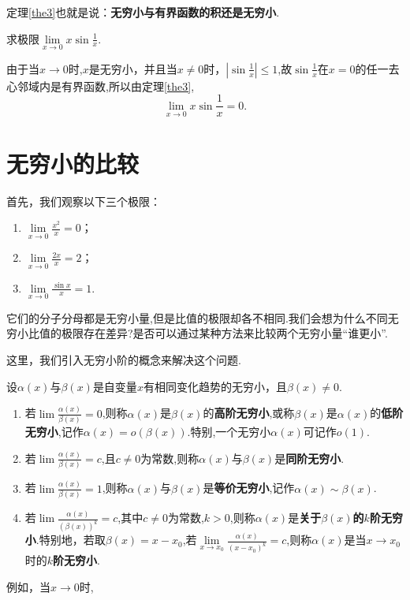 	定理\ref{the3}也就是说：\textbf{无穷小与有界函数的积还是无穷小}.
	
	\begin{example}
		求极限$\lim\limits_{x\to 0}x\sin\frac{1}{x}$.
	\end{example}

	\begin{solution}
		由于当$x\to 0$时,$x$是无穷小，并且当$x\ne 0$时，$\left|\sin\frac{1}{x}\right| \le 1$,故$\sin\frac{1}{x}$在$x=0$的任一去心邻域内是有界函数,所以由定理\ref{the3},
		\[
		\lim_{x\to 0}x\sin\frac{1}{x}=0.
		\]
	\end{solution}

	\section{无穷小的比较}
	首先，我们观察以下三个极限：
	\begin{enumerate}
		\item $\lim\limits_{x\to 0}\frac{x^2}{x}=0$；
		\item $\lim\limits_{x\to 0}\frac{2x}{x}=2$；
		\item $\lim\limits_{x\to 0}\frac{\sin{x}}{x}=1$.
	\end{enumerate}

	它们的分子分母都是无穷小量,但是比值的极限却各不相同.我们会想为什么不同无穷小比值的极限存在差异?是否可以通过某种方法来比较两个无穷小量“谁更小”.
	
	这里，我们引入无穷小阶的概念来解决这个问题.
	\begin{definition}
		设$\alpha (x)\text{与} \beta (x)$是自变量$x$有相同变化趋势的无穷小，且$\beta (x)\ne 0.$
		\begin{enumerate}
			\item 
			若$\lim\limits_{}\frac{\alpha(x)}{\beta (x)}=0$,则称$\alpha(x)$是$\beta(x)$的\textbf{高阶无穷小},或称$\beta(x)$是$\alpha(x)$的\textbf{低阶无穷小},记作$\alpha(x)=o(\beta(x))$.特别,一个无穷小$\alpha(x)$可记作$o(1)$.
			\item 
			若$\lim\limits_{}\frac{\alpha(x)}{\beta (x)}=c$,且$c\ne 0$为常数,则称$\alpha(x)$与$\beta(x)$是\textbf{同阶无穷小}.
			\item 
			若$\lim\limits_{}\frac{\alpha(x)}{\beta (x)}=1$,则称$\alpha(x)$与$\beta(x)$是\textbf{等价无穷小},记作$\alpha (x)\sim\beta(x)$.
			\item 
			若$\lim\limits_{}\frac{\alpha(x)}{(\beta (x))^k}=c$,其中$c\ne 0$为常数,$k>0$,则称$\alpha(x)$是\textbf{关于$\beta(x)$的$k$阶无穷小}.特别地，若取$\beta(x)=x-x_0$,若$\lim\limits_{x\to x_0}\frac{\alpha(x)}{(x-x_0)^k}=c$,则称$\alpha (x)$是当$x\to x_0$时的\textbf{$k$阶无穷小}.
		\end{enumerate}
	\end{definition}
	例如，当$x\to 0$时,
	
